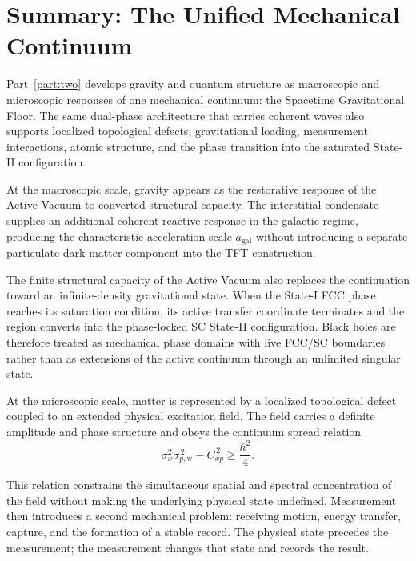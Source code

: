 \section*{Summary: The Unified Mechanical Continuum}
\label{sec:part_ii_conclusion}

Part~\ref{part:two} develops gravity and quantum structure as macroscopic and microscopic responses of one mechanical continuum: the Spacetime Gravitational Floor. The same dual-phase architecture that carries coherent waves also supports localized topological defects, gravitational loading, measurement interactions, atomic structure, and the phase transition into the saturated State-II configuration.

At the macroscopic scale, gravity appears as the restorative response of the Active Vacuum to converted structural capacity. The interstitial condensate supplies an additional coherent reactive response in the galactic regime, producing the characteristic acceleration scale $a_{\mathrm{gal}}$ without introducing a separate particulate dark-matter component into the TFT construction.

The finite structural capacity of the Active Vacuum also replaces the continuation toward an infinite-density gravitational state. When the State-I FCC phase reaches its saturation condition, its active transfer coordinate terminates and the region converts into the phase-locked SC State-II configuration. Black holes are therefore treated as mechanical phase domains with live FCC/SC boundaries rather than as extensions of the active continuum through an unlimited singular state.

At the microscopic scale, matter is represented by a localized topological defect coupled to an extended physical excitation field. The field carries a definite amplitude and phase structure and obeys the continuum spread relation
\begin{equation}
    \sigma_x^2
    \sigma_{p,\mathrm w}^{\,2}
    -
    C_{xp}^{\,2}
    \geq
    \frac{\hbar^2}{4}.
\end{equation}

This relation constrains the simultaneous spatial and spectral concentration of the field without making the underlying physical state undefined. Measurement then introduces a second mechanical problem: receiving motion, energy transfer, capture, and the formation of a stable record. The physical state precedes the measurement; the measurement changes that state and records the result.

